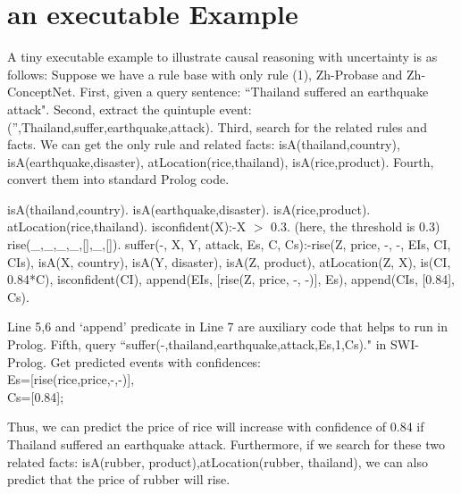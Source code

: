 \documentclass{article}
\begin{document}
\section{an executable Example}
\label{sec:example}
A tiny executable example to illustrate causal reasoning with uncertainty is as follows:
Suppose we have a rule base with only rule (1), Zh-Probase and Zh-ConceptNet.
First, given a query sentence: ``Thailand suffered an earthquake attack".
Second, extract the quintuple event: ('',Thailand,suffer,earthquake,attack).
Third, search for the related rules and facts. We can get the only rule and related facts: isA(thailand,country), isA(earthquake,disaster), atLocation(rice,thailand), isA(rice,product).
Fourth, convert them into standard Prolog code.\\

\begin{algorithm}[htb]
	\begin{algorithmic}[1]
		\STATE isA(thailand,country).
		\STATE isA(earthquake,disaster).
		\STATE isA(rice,product).
		\STATE atLocation(rice,thailand).
		\STATE isconfident(X):-X $>$ 0.3. (here, the threshold is 0.3)
		\STATE rise(\_,\_,\_,\_,[],\_,[]).
		\STATE suffer(-, X, Y, attack, Es, C, Cs):-rise(Z, price, -, -, EIs, CI, CIs), isA(X, country), isA(Y, disaster), isA(Z, product), atLocation(Z, X), is(CI, 0.84*C), isconfident(CI), append(EIs, [rise(Z, price, -, -)], Es), append(CIs, [0.84], Cs).
	\end{algorithmic}
\end{algorithm}	

Line 5,6 and `append' predicate in Line 7 are auxiliary code that helps to run in Prolog.
Fifth, query ``suffer(-,thailand,earthquake,attack,Es,1,Cs)." in SWI-Prolog.
Get predicted events with confidences:\\
Es=[rise(rice,price,-,-)],\\
Cs=[0.84];

Thus, we can predict the price of rice will increase with confidence of 0.84 if Thailand suffered an earthquake attack.
Furthermore, if we search for these two related facts: isA(rubber, product),atLocation(rubber, thailand), we can also predict that the price of rubber will rise.
\end{document}
